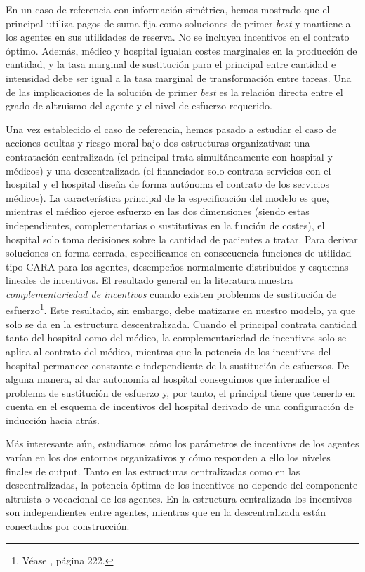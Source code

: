 ﻿\documentclass[12pt,letterpaper]{article}
\begin{document}
En un caso de referencia con información simétrica, hemos mostrado que el principal utiliza pagos de suma fija como soluciones de primer \emph{best} y mantiene a los agentes en sus utilidades de reserva. No se incluyen incentivos en el contrato óptimo. Además, médico y hospital igualan costes marginales en la producción de cantidad, y la tasa marginal de sustitución para el principal entre cantidad e intensidad debe ser igual a la tasa marginal de transformación entre tareas. Una de las implicaciones de la solución de primer \emph{best} es la relación directa entre el grado de altruismo del agente y el nivel de esfuerzo requerido.

Una vez establecido el caso de referencia, hemos pasado a estudiar el caso de acciones ocultas y riesgo moral bajo dos estructuras organizativas: una contratación centralizada (el principal trata simultáneamente con hospital y médicos) y una descentralizada (el financiador solo contrata servicios con el hospital y el hospital diseña de forma autónoma el contrato de los servicios médicos). La característica principal de la especificación del modelo es que, mientras el médico ejerce esfuerzo en las dos dimensiones (siendo estas independientes, complementarias o sustitutivas en la función de costes), el hospital solo toma decisiones sobre la cantidad de pacientes a tratar. Para derivar soluciones en forma cerrada, especificamos en consecuencia funciones de utilidad tipo CARA para los agentes, desempeños normalmente distribuidos y esquemas lineales de incentivos. El resultado general en la literatura muestra \emph{complementariedad de incentivos} cuando existen problemas de sustitución de esfuerzo\footnote{Véase \cite{Bolton05}, página 222.}. Este resultado, sin embargo, debe matizarse en nuestro modelo, ya que solo se da en la estructura descentralizada. Cuando el principal contrata cantidad tanto del hospital como del médico, la complementariedad de incentivos solo se aplica al contrato del médico, mientras que la potencia de los incentivos del hospital permanece constante e independiente de la sustitución de esfuerzos. De alguna manera, al dar autonomía al hospital conseguimos que internalice el problema de sustitución de esfuerzo y, por tanto, el principal tiene que tenerlo en cuenta en el esquema de incentivos del hospital derivado de una configuración de inducción hacia atrás.

Más interesante aún, estudiamos cómo los parámetros de incentivos de los agentes varían en los dos entornos organizativos y cómo responden a ello los niveles finales de output.
Tanto en las estructuras centralizadas como en las descentralizadas, la potencia óptima de los incentivos no depende del componente altruista o vocacional de los agentes. En la estructura centralizada los incentivos son independientes entre agentes, mientras que en la descentralizada están conectados por construcción.
\end{document}
